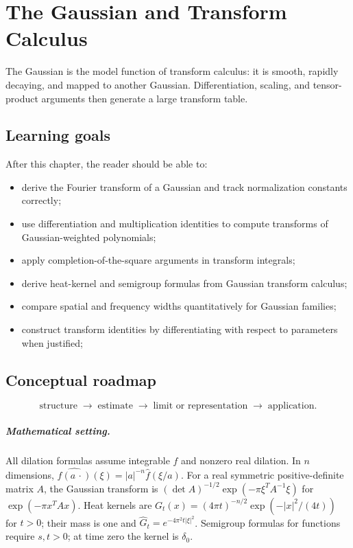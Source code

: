 \chapter{The Gaussian and Transform Calculus}
\label{ch:iii12}

The Gaussian is the model function of transform calculus: it is smooth, rapidly decaying, and mapped to another Gaussian. Differentiation, scaling, and tensor-product arguments then generate a large transform table.

\section*{Learning goals}
After this chapter, the reader should be able to:
\begin{itemize}
\item derive the Fourier transform of a Gaussian and track normalization constants correctly;
\item use differentiation and multiplication identities to compute transforms of Gaussian-weighted polynomials;
\item apply completion-of-the-square arguments in transform integrals;
\item derive heat-kernel and semigroup formulas from Gaussian transform calculus;
\item compare spatial and frequency widths quantitatively for Gaussian families;
\item construct transform identities by differentiating with respect to parameters when justified;
\end{itemize}
\section*{Conceptual roadmap}
\[
\boxed{\text{structure}\;\longrightarrow\;\text{estimate}\;\longrightarrow\;\text{limit or representation}\;\longrightarrow\;\text{application}.}
\]

\paragraph{Mathematical setting.}
All dilation formulas assume integrable $f$ and nonzero real dilation. In $n$ dimensions, $\widehat{f(a\,\cdot)}(\xi)=|a|^{-n}\widehat f(\xi/a)$. For a real symmetric positive-definite matrix $A$, the Gaussian transform is $(\det A)^{-1/2}\exp(-\pi\xi^TA^{-1}\xi)$ for $\exp(-\pi x^TAx)$. Heat kernels are $G_t(x)=(4\pi t)^{-n/2}\exp(-|x|^2/(4t))$ for $t>0$; their mass is one and $\widehat G_t=e^{-4\pi^2t|\xi|^2}$. Semigroup formulas for functions require $s,t>0$; at time zero the kernel is $\delta_0$.


